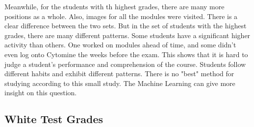 \documentclass[a4paper,11pt]{report}
\numberwithin{figure}{chapter} %
\begin{document}
    Meanwhile, for the students with th highest grades, there are many more positions as a whole.
    Also, images for all the modules were visited.
    There is a clear difference between the two sets.
    But in the set of students with the highest grades, there are many different patterns.
    Some students have a significant higher activity than others.
    One worked on modules ahead of time, and some didn't even log onto Cytomine the weeks before the exam.
    This shows that it is hard to judge a student's performance and comprehension of the course.
    Students follow different habits and exhibit different patterns.
    There is no "best" method for studying according to this small study.
    The Machine Learning can give more insight on this question.



    \subsection{White Test Grades}
\end{document}
